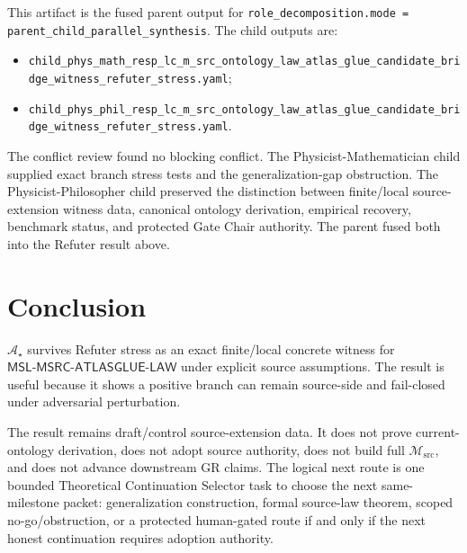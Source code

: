 \documentclass[11pt]{article}
\newcommand{\Msrc}{\mathcal{M}_{\mathrm{src}}}
\newcommand{\MSL}{\mathsf{MSL}\mbox{-}\mathsf{MSRC}\mbox{-}\mathsf{ATLASGLUE}\mbox{-}\mathsf{LAW}}
\newcommand{\Astar}{\mathcal A_{\star}}
\begin{document}
This artifact is the fused parent output for
\texttt{role\_decomposition.mode = parent\_child\_parallel\_synthesis}. The
child outputs are:
\begin{itemize}
  \item \texttt{child\_phys\_math\_resp\_lc\_m\_src\_ontology\_law\_atlas\_glue\_candidate\_bridge\_witness\_refuter\_stress.yaml};
  \item \texttt{child\_phys\_phil\_resp\_lc\_m\_src\_ontology\_law\_atlas\_glue\_candidate\_bridge\_witness\_refuter\_stress.yaml}.
\end{itemize}
The conflict review found no blocking conflict. The
Physicist-Mathematician child supplied exact branch stress tests and the
generalization-gap obstruction. The Physicist-Philosopher child preserved the
distinction between finite/local source-extension witness data, canonical
ontology derivation, empirical recovery, benchmark status, and protected Gate
Chair authority. The parent fused both into the Refuter result above.

\section{Conclusion}

\(\Astar\) survives Refuter stress as an exact finite/local concrete witness
for \(\MSL\) under explicit source assumptions. The result is useful because
it shows a positive branch can remain source-side and fail-closed under
adversarial perturbation.

The result remains draft/control source-extension data. It does not prove
current-ontology derivation, does not adopt source authority, does not build
full \(\Msrc\), and does not advance downstream GR claims. The logical next
route is one bounded Theoretical Continuation Selector task to choose the next
same-milestone packet: generalization construction, formal source-law theorem,
scoped no-go/obstruction, or a protected human-gated route if and only if the
next honest continuation requires adoption authority.
\end{document}
